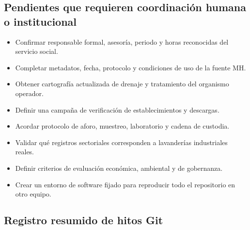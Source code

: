 \documentclass[
  spanish,
]{article}
\providecommand{\tightlist}{%
  \setlength{\itemsep}{0pt}\setlength{\parskip}{0pt}}
\begin{document}
\subsection{Pendientes que requieren coordinación humana o
institucional}\label{pendientes-que-requieren-coordinaciuxf3n-humana-o-institucional}

\begin{itemize}
\tightlist
\item
  Confirmar responsable formal, asesoría, periodo y horas reconocidas
  del servicio social.
\item
  Completar metadatos, fecha, protocolo y condiciones de uso de la
  fuente MH.
\item
  Obtener cartografía actualizada de drenaje y tratamiento del organismo
  operador.
\item
  Definir una campaña de verificación de establecimientos y descargas.
\item
  Acordar protocolo de aforo, muestreo, laboratorio y cadena de
  custodia.
\item
  Validar qué registros sectoriales corresponden a lavanderías
  industriales reales.
\item
  Definir criterios de evaluación económica, ambiental y de gobernanza.
\item
  Crear un entorno de software fijado para reproducir todo el
  repositorio en otro equipo.
\end{itemize}

\subsection{Registro resumido de hitos
Git}\label{registro-resumido-de-hitos-git}
\end{document}
